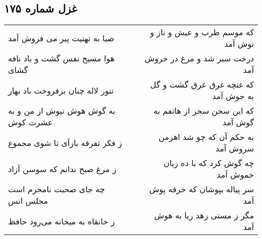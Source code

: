 \begin{center}
\section*{غزل شماره ۱۷۵}
\label{sec:sh175}
\begin{longtable}{l p{0.5cm} r}
صبا به تهنیت پیر می فروش آمد
&&
که موسم طرب و عیش و ناز و نوش آمد
\\
هوا مسیح نفس گشت و باد نافه گشای
&&
درخت سبز شد و مرغ در خروش آمد
\\
تنور لاله چنان برفروخت باد بهار
&&
که غنچه غرق عرق گشت و گل به جوش آمد
\\
به گوش هوش نیوش از من و به عشرت کوش
&&
که این سخن سحر از هاتفم به گوش آمد
\\
ز فکر تفرقه بازآی تا شوی مجموع
&&
به حکم آن که چو شد اهرمن سروش آمد
\\
ز مرغ صبح ندانم که سوسن آزاد
&&
چه گوش کرد که با ده زبان خموش آمد
\\
چه جای صحبت نامحرم است مجلس انس
&&
سر پیاله بپوشان که خرقه پوش آمد
\\
ز خانقاه به میخانه می‌رود حافظ
&&
مگر ز مستی زهد ریا به هوش آمد
\\
\end{longtable}
\end{center}
